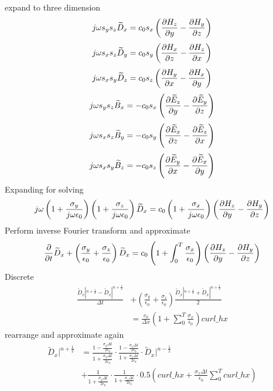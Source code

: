 expand to three dimension
\begin{equation}
  j\omega s_y s_z \widetilde{D}_x = c_0 s_x \left( \frac{\partial H_z}{\partial y} - \frac{\partial H_y}{\partial z} \right)
\end{equation}
\begin{equation}
  j\omega s_x s_z \widetilde{D}_y = c_0 s_y \left( \frac{\partial H_x}{\partial z} - \frac{\partial H_z}{\partial x} \right)
\end{equation}
\begin{equation}
  j\omega s_x s_y \widetilde{D}_z = c_0 s_z \left( \frac{\partial H_y}{\partial x} - \frac{\partial H_x}{\partial y} \right)
\end{equation}
\begin{equation}
  j\omega s_y s_z \widetilde{B}_x =-c_0 s_x \left(\frac{\partial \widetilde{E}_z}{\partial y} - \frac{\partial \widetilde{E}_y}{\partial z}\right)
\end{equation}
\begin{equation}
  j\omega s_x s_z \widetilde{B}_y =-c_0 s_y \left(\frac{\partial \widetilde{E}_x}{\partial z} - \frac{\partial \widetilde{E}_z}{\partial x}\right)
\end{equation}
\begin{equation}
  j\omega s_x s_y \widetilde{B}_z =-c_0 s_z \left(\frac{\partial \widetilde{E}_y}{\partial x} - \frac{\partial \widetilde{E}_x}{\partial y}\right)
\end{equation}
Expanding for solving
\begin{equation}
  j\omega
  \left( 1 + \frac{\sigma_y}{j\omega \epsilon_0} \right)
  \left( 1 + \frac{\sigma_z}{j\omega \epsilon_0} \right)\widetilde{D}_x 
  = c_0 \left( 1+\frac{\sigma_x}{j\omega \epsilon_0} \right) \left( \frac{\partial H_z}{\partial y} - \frac{\partial H_y}{\partial z} \right)
\end{equation}
Perform inverse Fourier transform and approximate 
\begin{equation}
  \frac{\partial}{\partial t}\widetilde{D}_x + \left( \frac{\sigma_y}{\epsilon_0} + \frac{\sigma_z}{\epsilon_0} \right) \widetilde{D}_x
  = c_0 \left( 1+\int_0^T\frac{\sigma_x}{\epsilon_0} \right) \left( \frac{\partial H_z}{\partial y} - \frac{\partial H_y}{\partial z} \right)
\end{equation}
Discrete
\begin{equation}
  \begin{split}
    \frac{\widetilde{D}_x|^{n+\frac{1}{2}} - \widetilde{D}_x|^{n+\frac{1}{2}}}{\Delta t} &+
    \left( \frac{\sigma_y}{\epsilon_0} + \frac{\sigma_z}{\epsilon_0} \right) \frac{\widetilde{D}_x|^{n+\frac{1}{2}} + \widetilde{D}_x|^{n+\frac{1}{2}}}{2} \\
    &=\frac{c_0}{\Delta x} \left( 1 + \sum_0^T \frac{\sigma_x}{\epsilon_0} \right) curl\_hx
  \end{split}
\end{equation}
rearrange and approximate again
\begin{equation}
  \begin{split}
    \widetilde{D}_x|^{n+\frac{1}{2}} &=
    \frac{\displaystyle 1 - \frac{\sigma_y\Delta t}{2\epsilon_0}}{\displaystyle 1 + \frac{\sigma_y\Delta t}{2\epsilon_0}} \cdot \frac{\displaystyle 1 - \frac{\sigma_z\Delta t}{2\epsilon_0}}{\displaystyle 1 + \frac{\sigma_z\Delta t}{2\epsilon_0}} \cdot \widetilde{D}_x|^{n-\frac{1}{2}}\\
    & + \frac{1}{\displaystyle 1 + \frac{\sigma_y\Delta t}{2\epsilon_0}} \cdot \frac{1}{\displaystyle 1 + \frac{\sigma_z\Delta t}{2\epsilon_0}} \cdot 0.5 \left( curl\_hx + \frac{\sigma_x \Delta t}{\epsilon_0}\sum_0^T curl\_hx \right)
  \end{split}
\end{equation}
